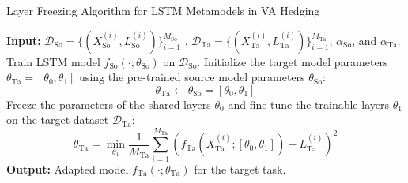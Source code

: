\documentclass[9pt,handout]{beamer}
\begin{document}
\begin{frame}{Layer Freezing Algorithm for LSTM Metamodels in VA Hedging}

    \begin{algorithm}[H]
        \caption{Layer Freezing Algorithm for LSTM Metamodels in VA Hedging}
        \begin{algorithmic}[1]
            \STATE \textbf{Input:} $\mathcal{D}_{\text{So}} = \{(X_{\text{So}}^{(i)}, L_{\text{So}}^{(i)})\}_{i=1}^{M_{\text{So}}}$ , $\mathcal{D}_{\text{Ta}} = \{(X_{\text{Ta}}^{(i)}, L_{\text{Ta}}^{(i)})\}_{i=1}^{M_{\text{Ta}}}$, $\alpha_{\text{So}}$, and $\alpha_{\text{Ta}}$.
            \STATE Train LSTM model $f_{\text{So}}(\cdot; \theta_{\text{So}})$ on $\mathcal{D}_{\text{So}}$.
            \STATE Initialize the target model parameters $\theta_{\text{Ta}} = [\theta_0, \theta_1]$ using the pre-trained source model parameters $\theta_{\text{So}}$:
            \begin{equation*}
                \theta_{\text{Ta}} \gets \theta_{\text{So}} = [\theta_0, \theta_1]
            \end{equation*}
            \STATE Freeze the parameters of the shared layers $\theta_0$ and fine-tune the trainable layers $\theta_1$ on the target dataset $\mathcal{D}_{\text{Ta}}$:
            \begin{equation*}
                \theta_{\text{Ta}} = \min_{\theta_1} \frac{1}{M_{\text{Ta}}} \sum_{i=1}^{M_{\text{Ta}}} \left( f_{\text{Ta}}(X_{\text{Ta}}^{(i)}; [\theta_0, \theta_1]) - L_{\text{Ta}}^{(i)} \right)^2
            \end{equation*}
            \STATE \textbf{Output:} Adapted model $f_{\text{Ta}}(\cdot; \theta_{\text{Ta}})$ for the target task.
        \end{algorithmic}
    \end{algorithm}

\end{frame}
\end{document}
